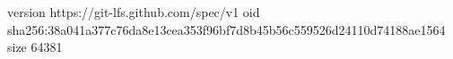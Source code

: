 version https://git-lfs.github.com/spec/v1
oid sha256:38a041a377c76da8e13cea353f96bf7d8b45b56c559526d24110d74188ae1564
size 64381
